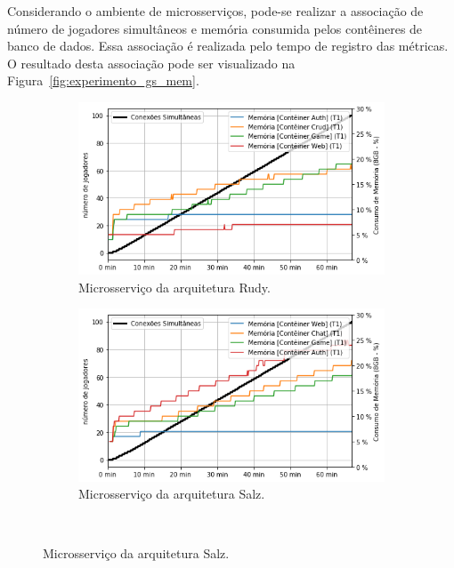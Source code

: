 Considerando o ambiente de microsserviços, pode-se realizar a associação de número de jogadores simultâneos e memória consumida pelos contêineres de banco de dados.
%
Essa associação é realizada pelo tempo de registro das métricas.
%
O resultado desta associação pode ser visualizado na Figura~\ref{fig:experimento_gs_mem}.

\vspace{-0.3cm}
\begin{figure}[htb!]
    \caption{Consumo de memória dos microsserviços.}
    \label{fig:experimento_gs_mem}

    \begin{subfigure}{0.5\textwidth}
        \centering
        \includegraphics[width=.95\linewidth]{figuras/testes/r_mem_game.png}
        \caption{Microsserviço da arquitetura Rudy.}
        \label{fig:r_mem_game}
    \end{subfigure}%
    \begin{subfigure}{0.5\textwidth}
        \centering
        \includegraphics[width=.95\linewidth]{figuras/testes/s_mem_game.png}
        \caption{Microsserviço da arquitetura Salz.}
        \label{fig:s_mem_game}
    \end{subfigure}\\


\end{figure}
